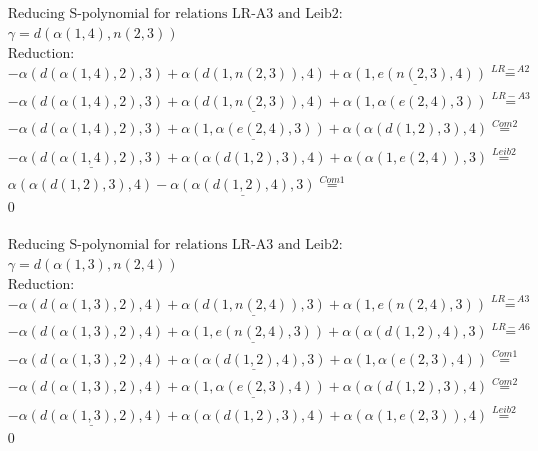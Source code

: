 \documentclass[11pt]{amsart}
\begin{document}
\begin{align*} 
& \text{Reducing S-polynomial for relations LR-A3 and Leib2:} \\ 
& \gamma = d(\alpha(1,4),n(2,3)) \\ 
& \text{Reduction}: \\& - \alpha(d(\alpha(1,4),2),3) + \alpha(d(1,n(2,3)),4) + \underline{\alpha(1,e(n(2,3),4))} \stackrel{ LR-A2 }{=}  \\ 
& - \alpha(d(\alpha(1,4),2),3) + \underline{\alpha(d(1,n(2,3)),4)} + \alpha(1,\alpha(e(2,4),3)) \stackrel{ LR-A3 }{=}  \\ 
& - \alpha(d(\alpha(1,4),2),3) + \underline{\alpha(1,\alpha(e(2,4),3))} + \alpha(\alpha(d(1,2),3),4) \stackrel{ Com2 }{=}  \\ 
& - \underline{\alpha(d(\alpha(1,4),2),3)} + \alpha(\alpha(d(1,2),3),4) + \alpha(\alpha(1,e(2,4)),3) \stackrel{ Leib2 }{=}  \\ 
&\alpha(\alpha(d(1,2),3),4) - \underline{\alpha(\alpha(d(1,2),4),3)} \stackrel{ Com1 }{=}  \\ 
&0\\ 
\end{align*} 
 
\begin{align*} 
& \text{Reducing S-polynomial for relations LR-A3 and Leib2:} \\ 
& \gamma = d(\alpha(1,3),n(2,4)) \\ 
& \text{Reduction}: \\& - \alpha(d(\alpha(1,3),2),4) + \underline{\alpha(d(1,n(2,4)),3)} + \alpha(1,e(n(2,4),3)) \stackrel{ LR-A3 }{=}  \\ 
& - \alpha(d(\alpha(1,3),2),4) + \underline{\alpha(1,e(n(2,4),3))} + \alpha(\alpha(d(1,2),4),3) \stackrel{ LR-A6 }{=}  \\ 
& - \alpha(d(\alpha(1,3),2),4) + \underline{\alpha(\alpha(d(1,2),4),3)} + \alpha(1,\alpha(e(2,3),4)) \stackrel{ Com1 }{=}  \\ 
& - \alpha(d(\alpha(1,3),2),4) + \underline{\alpha(1,\alpha(e(2,3),4))} + \alpha(\alpha(d(1,2),3),4) \stackrel{ Com2 }{=}  \\ 
& - \underline{\alpha(d(\alpha(1,3),2),4)} + \alpha(\alpha(d(1,2),3),4) + \alpha(\alpha(1,e(2,3)),4) \stackrel{ Leib2 }{=}  \\ 
&0\\ 
\end{align*} 
 
\end{document}
